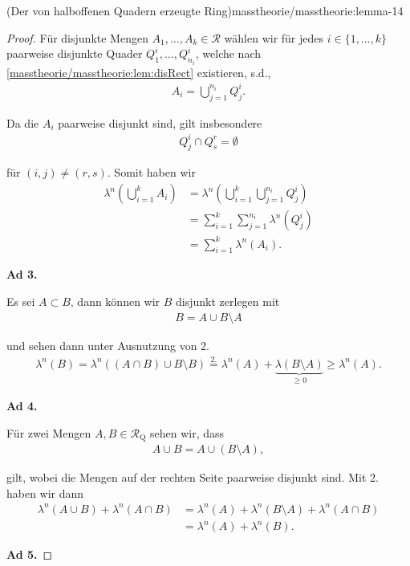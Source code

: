 \begin{lemma}{(Der von halboffenen Quadern erzeugte Ring)}{masstheorie/masstheorie:lemma-14}
\begin{proof}
\par
Für disjunkte Mengen \(A_1,\ldots, A_k\in\mathcal{R}\) wählen wir für jedes \(i\in\{1,\ldots,k\}\) paarweise disjunkte Quader
\(Q^i_1,\ldots, Q^i_{n_i}\), welche nach \cref{masstheorie/masstheorie:lem:disRect} existieren, s.d.,
\begin{align*}
A_i = \bigcup_{j=1}^{n_i} Q^i_j.
\end{align*}
\par
Da die \(A_i\) paarweise disjunkt sind, gilt insbesondere
\begin{align*}
Q^i_j \cap Q^r_s = \emptyset
\end{align*}
\par
für \((i,j)\neq (r,s)\). Somit haben wir
\begin{align*}
\lambda^n\left(\bigcup_{i=1}^k A_i \right) &= \lambda^n\left(\bigcup_{i=1}^k \bigcup_{j=1}^{n_i} Q^i_j \right) 
\\&=
\sum_{i=1}^k \sum_{j=1}^{n_i} \lambda^n(Q^i_j)
\\&= 
\sum_{i=1}^k \lambda^n(A_i).
\end{align*}
\par
\textbf{Ad 3.}

\par
Es sei \(A\subset B\), dann können wir \(B\) disjunkt zerlegen mit
\begin{align*}
B = A \cup B\setminus A
\end{align*}
\par
und sehen dann unter Ausnutzung von 2.
\begin{align*}
\lambda^n(B) = \lambda^n((A\cap B)\cup B\setminus B) \overset{2.}{=} 
\lambda^n(A) + \underbrace{\lambda(B\setminus A)}_{\geq 0} \geq \lambda^n(A).
\end{align*}
\par
\textbf{Ad 4.}

\par
Für zwei Mengen \(A,B\in\mathcal{R}_{\text{Q}}\) sehen wir, dass
\begin{align*}
A\cup B = A \cup (B\setminus A),
\end{align*}
\par
gilt, wobei die Mengen auf der rechten Seite paarweise disjunkt sind. Mit 2. haben wir dann
\begin{align*}
\lambda^n(A\cup B) + \lambda^n(A\cap B)
&= \lambda^n(A) + \lambda^n(B\setminus A) + \lambda^n(A\cap B)
\\&= 
\lambda^n(A) + \lambda^n(B).
\end{align*}
\par
\textbf{Ad 5.}


\end{proof}
\end{lemma}
